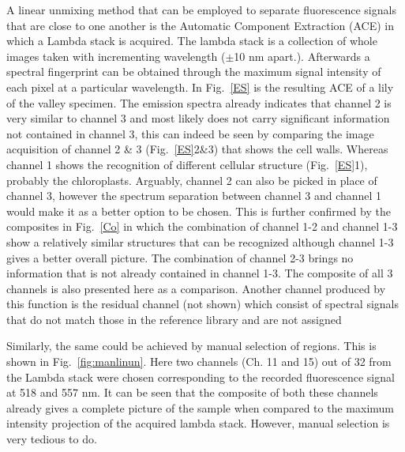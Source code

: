 A linear unmixing method that can be employed to separate fluorescence signals that are close to one another is the Automatic Component Extraction (ACE) in which a Lambda stack is acquired. 
The lambda stack is a collection of whole images taken with incrementing wavelength ($\pm$10 nm apart.). 
Afterwards a spectral fingerprint can be obtained through the maximum signal intensity of each pixel at a particular wavelength. 
In Fig.~\ref{ES} is the resulting ACE of a lily of the valley specimen. 
The emission spectra already indicates that channel 2 is very similar to channel 3 and most likely does not carry significant information not contained in channel 3, this can indeed be seen by comparing the image acquisition of channel 2 \& 3 (Fig.~\ref{ES}2\&3) that shows the cell walls. 
Whereas channel 1 shows the recognition of different cellular structure (Fig.~\ref{ES}1), probably the chloroplasts. 
Arguably, channel 2 can also be picked in place of channel 3, however the spectrum separation between channel 3 and channel 1 would make it as a better option to be chosen. 
This is further confirmed by the composites in Fig.~\ref{Co} in which the combination of channel 1-2 and channel 1-3 show a relatively similar structures that can be recognized although channel 1-3 gives a better overall picture. 
The combination of channel 2-3 brings no information that is not already contained in channel 1-3. 
The composite of all 3 channels is also presented here as a comparison. 
Another channel produced by this function is the residual channel (not shown) which consist of spectral signals that do not match those in the reference library and are not assigned~\cite{ZeissCamp3}

Similarly, the same could be achieved by manual selection of regions. 
This is shown in Fig.~\ref{fig:manlinun}. Here two channels (Ch. 11 and 15) out of 32 from the Lambda stack were chosen corresponding to the recorded fluorescence signal at 518 and 557 nm. 
It can be seen that the composite of both these channels already gives a complete picture of the sample when compared to the maximum intensity projection of the acquired lambda stack. 
However, manual selection is very tedious to do. 


